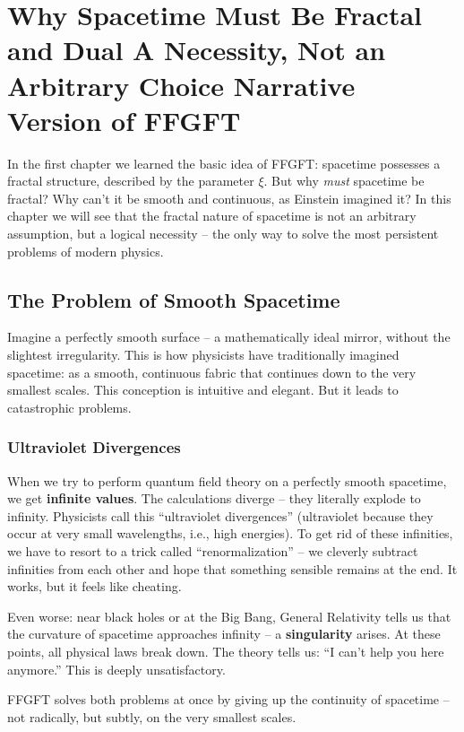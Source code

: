 \chapter{Why Spacetime Must Be Fractal and Dual  A Necessity, Not an Arbitrary Choice  Narrative Version of FFGFT}



In the first chapter we learned the basic idea of FFGFT: spacetime possesses a fractal structure, described by the parameter $\xi$. But why \textit{must} spacetime be fractal? Why can't it be smooth and continuous, as Einstein imagined it? In this chapter we will see that the fractal nature of spacetime is not an arbitrary assumption, but a logical necessity -- the only way to solve the most persistent problems of modern physics.

\section{The Problem of Smooth Spacetime}

Imagine a perfectly smooth surface -- a mathematically ideal mirror, without the slightest irregularity. This is how physicists have traditionally imagined spacetime: as a smooth, continuous fabric that continues down to the very smallest scales. This conception is intuitive and elegant. But it leads to catastrophic problems.

\subsection{Ultraviolet Divergences}

When we try to perform quantum field theory on a perfectly smooth spacetime, we get \textbf{infinite values}. The calculations diverge -- they literally explode to infinity. Physicists call this ``ultraviolet divergences'' (ultraviolet because they occur at very small wavelengths, i.e., high energies). To get rid of these infinities, we have to resort to a trick called ``renormalization'' -- we cleverly subtract infinities from each other and hope that something sensible remains at the end. It works, but it feels like cheating.

Even worse: near black holes or at the Big Bang, General Relativity tells us that the curvature of spacetime approaches infinity -- a \textbf{singularity} arises. At these points, all physical laws break down. The theory tells us: ``I can't help you here anymore.'' This is deeply unsatisfactory.

FFGFT solves both problems at once by giving up the continuity of spacetime -- not radically, but subtly, on the very smallest scales.

